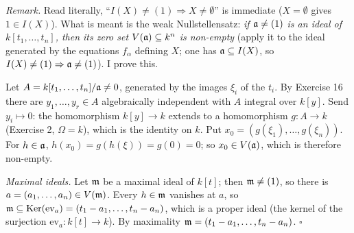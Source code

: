 \documentclass[11pt]{article}
\begin{document}
\pf
\emph{Remark.} Read literally, ``$I(X)\ne(1)\Rightarrow X\ne\emptyset$'' is immediate ($X=\emptyset$ gives $1\in I(X)$). What is meant is the weak Nullstellensatz: \emph{if $\mathfrak a\ne(1)$ is an ideal of $k[t_1,\dots,t_n]$, then its zero set $V(\mathfrak a)\subseteq k^n$ is non-empty} (apply it to the ideal generated by the equations $f_\alpha$ defining $X$; one has $\mathfrak a\subseteq I(X)$, so $I(X)\ne(1)\Rightarrow\mathfrak a\ne(1)$). I prove this.

Let $A=k[t_1,\dots,t_n]/\mathfrak a\ne0$, generated by the images $\xi_i$ of the $t_i$. By Exercise 16 there are $y_1,\dots,y_r\in A$ algebraically independent with $A$ integral over $k[y]$. Send $y_i\mapsto0$: the homomorphism $k[y]\to k$ extends to a homomorphism $g:A\to k$ (Exercise 2, $\Omega=k$), which is the identity on $k$. Put $x_0=(g(\xi_1),\dots,g(\xi_n))$. For $h\in\mathfrak a$, $h(x_0)=g(h(\xi))=g(0)=0$; so $x_0\in V(\mathfrak a)$, which is therefore non-empty.

\emph{Maximal ideals.} Let $\mathfrak m$ be a maximal ideal of $k[t]$; then $\mathfrak m\ne(1)$, so there is $a=(a_1,\dots,a_n)\in V(\mathfrak m)$. Every $h\in\mathfrak m$ vanishes at $a$, so $\mathfrak m\subseteq\operatorname{Ker}(\mathrm{ev}_a)=(t_1-a_1,\dots,t_n-a_n)$, which is a proper ideal (the kernel of the surjection $\mathrm{ev}_a:k[t]\to k$). By maximality $\mathfrak m=(t_1-a_1,\dots,t_n-a_n)$. \hfill$\square$
\end{document}
